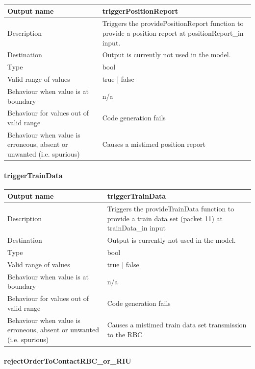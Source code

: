 \begin{longtable}{p{}p{}}
	\toprule
	Output name				& triggerPositionReport \\
	\midrule
	Description				& Triggers the providePositionReport function to provide a position report at positionReport\_in input. \\
	\midrule
	Destination				& Output is currently not used in the model. \\ 
	\midrule
	Type					& bool \\
	\midrule
	Valid range of values	& true | false \\
	\midrule
	Behaviour when value is at boundary	& n/a \\
	\midrule
	Behaviour for values out of valid range	& Code generation fails \\
	\midrule
	Behaviour when value is erroneous, absent or unwanted (i.e. spurious) & Causes a mistimed position report  \\
	\bottomrule
\end{longtable}


\paragraph{triggerTrainData}

\begin{longtable}{p{}p{}}
	\toprule
	Output name				& triggerTrainData \\
	\midrule
	Description				& Triggers the provideTrainData function to provide a train data set (packet 11) at trainData\_in input \\
	\midrule
	Destination				& Output is currently not used in the model. \\ 
	\midrule
	Type					& bool \\
	\midrule
	Valid range of values	& true | false \\
	\midrule
	Behaviour when value is at boundary	& n/a \\
	\midrule
	Behaviour for values out of valid range	& Code generation fails \\
	\midrule
	Behaviour when value is erroneous, absent or unwanted (i.e. spurious) & Causes a mistimed train data set transmission to the RBC \\
	\bottomrule
\end{longtable}

\paragraph{rejectOrderToContactRBC\_or\_RIU}

